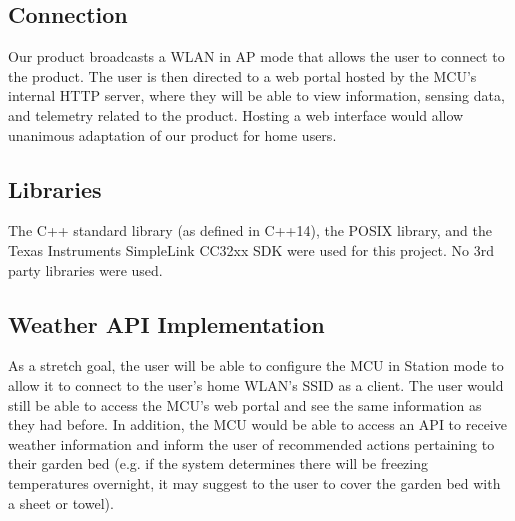 \documentclass[journal]{IEEEtran}
\begin{document}
\subsection{Connection}
Our product broadcasts a WLAN in AP mode that allows the user to connect to the product. The user is then directed to a web portal hosted by the MCU's internal HTTP server, where they will be able to view information, sensing data, and telemetry related to the product. Hosting a web interface would allow unanimous adaptation of our product for home users.

\subsection{Libraries}
The C++ standard library (as defined in C++14), the POSIX library, and the Texas Instruments SimpleLink CC32xx SDK were used for this project. No 3rd party libraries were used.

\subsection{Weather API Implementation}
As a stretch goal, the user will be able to configure the MCU in Station mode to allow it to connect to the user's home WLAN's SSID as a client. The user would still be able to access the MCU's web portal and see the same information as they had before. In addition, the MCU would be able to access an API to receive weather information and inform the user of recommended actions pertaining to their garden bed (e.g. if the system determines there will be freezing temperatures overnight, it may suggest to the user to cover the garden bed with a sheet or towel).
\end{document}
